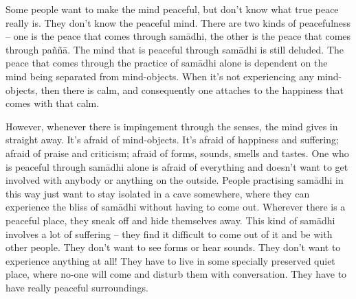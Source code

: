 Some people want to make the mind peaceful, but don't know what true peace really is. They don't know the peaceful mind. There are two kinds of peacefulness -- one is the peace that comes through sam\=adhi, the other is the peace that comes through pa\~n\~n\=a. The mind that is peaceful through sam\=adhi is still deluded. The peace that comes through the practice of sam\=adhi alone is dependent on the mind being separated from mind-objects. When it's not experiencing any mind-objects, then there is calm, and consequently one attaches to the happiness that comes with that calm.

However, whenever there is impingement through the senses, the mind gives in straight away. It's afraid of mind-objects. It's afraid of happiness and suffering; afraid of praise and criticism; afraid of forms, sounds, smells and tastes. One who is peaceful through sam\=adhi alone is afraid of everything and doesn't want to get involved with anybody or anything on the outside. People practising sam\=adhi in this way just want to stay isolated in a cave somewhere, where they can experience the bliss of sam\=adhi without having to come out. Wherever there is a peaceful place, they sneak off and hide themselves away. This kind of sam\=adhi involves a lot of suffering -- they find it difficult to come out of it and be with other people. They don't want to see forms or hear sounds. They don't want to experience anything at all! They have to live in some specially preserved quiet place, where no-one will come and disturb them with conversation. They have to have really peaceful surroundings.


